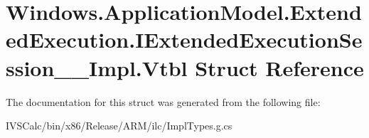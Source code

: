 \hypertarget{struct_windows_1_1_application_model_1_1_extended_execution_1_1_i_extended_execution_session_____impl_1_1_vtbl}{}\section{Windows.\+Application\+Model.\+Extended\+Execution.\+I\+Extended\+Execution\+Session\+\_\+\+\_\+\+Impl.\+Vtbl Struct Reference}
\label{struct_windows_1_1_application_model_1_1_extended_execution_1_1_i_extended_execution_session_____impl_1_1_vtbl}


The documentation for this struct was generated from the following file\+:\begin{DoxyCompactItemize}
\item 
I\+V\+S\+Calc/bin/x86/\+Release/\+A\+R\+M/ilc/Impl\+Types.\+g.\+cs\end{DoxyCompactItemize}
